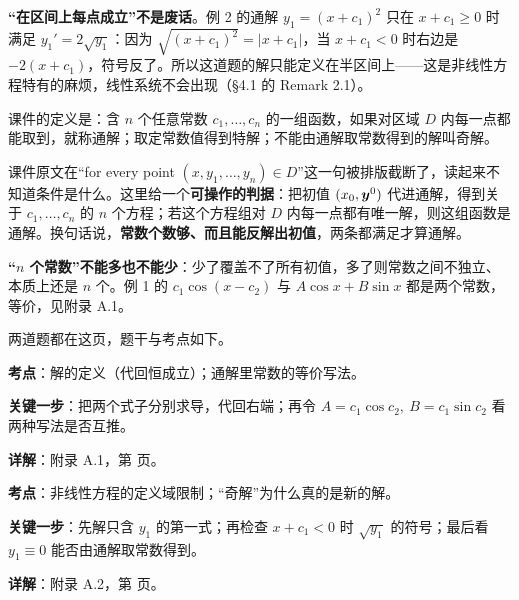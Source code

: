 \documentclass[11pt]{ctexart}
\renewcommand{\qbreak}{\needspace{0.26\textheight}}
\begin{document}
\textbf{“在区间上每点成立”不是废话}。例 2 的通解 $y_1=(x+c_1)^2$ 只在 $x+c_1\ge0$ 时满足 $y_1'=2\sqrt{y_1}$：因为 $\sqrt{(x+c_1)^2}=|x+c_1|$，当 $x+c_1<0$ 时右边是 $-2(x+c_1)$，符号反了。所以这道题的解只能定义在半区间上——这是非线性方程特有的麻烦，线性系统不会出现（§4.1 的 Remark 2.1）。


课件的定义是：含 $n$ 个任意常数 $c_1,\dots,c_n$ 的一组函数，如果对区域 $D$ 内每一点都能取到，就称通解；取定常数值得到特解；不能由通解取常数得到的解叫奇解。

课件原文在“for every point $(x,y_1,\dots,y_n)\in D$”这一句被排版截断了，读起来不知道条件是什么。这里给一个\textbf{可操作的判据}：把初值 $(x_0,\boldsymbol{y}^0)$ 代进通解，得到关于 $c_1,\dots,c_n$ 的 $n$ 个方程；若这个方程组对 $D$ 内每一点都有唯一解，则这组函数是通解。换句话说，\textbf{常数个数够、而且能反解出初值}，两条都满足才算通解。

\textbf{“$n$ 个常数”不能多也不能少}：少了覆盖不了所有初值，多了则常数之间不独立、本质上还是 $n$ 个。例 1 的 $c_1\cos(x-c_2)$ 与 $A\cos x+B\sin x$ 都是两个常数，等价，见附录 A.1。


两道题都在这页，题干与考点如下。

\qbreak
{}
\par\textbf{考点}：解的定义（代回恒成立）；通解里常数的等价写法。
\par\textbf{关键一步}：把两个式子分别求导，代回右端；再令 $A=c_1\cos c_2,\ B=c_1\sin c_2$ 看两种写法是否互推。
\par\textbf{详解}：附录 A.1，第 \pageref{app:a1} 页。

\qbreak
{}
\par\textbf{考点}：非线性方程的定义域限制；“奇解”为什么真的是新的解。
\par\textbf{关键一步}：先解只含 $y_1$ 的第一式；再检查 $x+c_1<0$ 时 $\sqrt{y_1}$ 的符号；最后看 $y_1\equiv0$ 能否由通解取常数得到。
\par\textbf{详解}：附录 A.2，第 \pageref{app:a2} 页。
\end{document}
